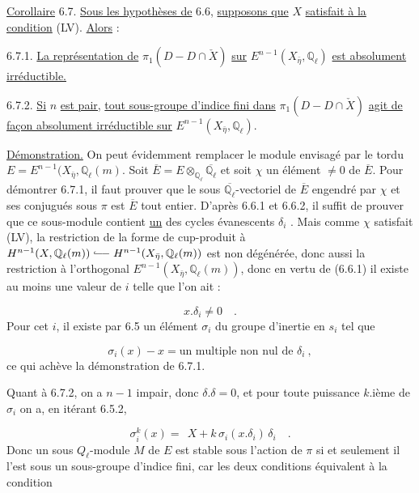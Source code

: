 
\underline{Corollaire} 6.7. \underline{Sous les hypothèses de} 6.6, \underline{supposons que} $X$ \underline{satisfait à la condition} (LV). \underline{Alors} :

6.7.1. \underline{La représentation de} $\pi_1(D - D \cap \check{X})$ \underline{sur} $E^{n-1}(X_{\bar{\eta}},\mathbb{Q}_\ell)$ \underline{est absolument irréductible.}

6.7.2. \underline{Si} $n$ \underline{est pair,} \underline{tout sous-groupe d'indice fini dans} $\pi_1(D - D \cap \check{X})$ \underline{agit de façon absolument irréductible sur} $E^{n-1}(X_{\bar{\eta}},\mathbb{Q}_\ell)$.

\underline{Démonstration.} On peut évidemment remplacer le module envisagé par le tordu $E = E^{n-1}(X_{\bar{\eta}},\mathbb{Q}_\ell(m)$. Soit $\overline{E} = E \otimes_{\mathbb{Q}_\ell} \overline{\mathbb{Q}_\ell}$ et soit $\chi$ un élément $\neq 0$ de $\overline{E}$. Pour démontrer 6.7.1, il faut prouver que le sous $\overline{\mathbb{Q}_\ell}$-vectoriel de $\overline{E}$ engendré par $\chi$ et ses conjugués sous $\pi$ est $\overline{E}$ tout entier. D'après 6.6.1 et 6.6.2, il suffit de prouver que ce sous-module contient \underline{un} des cycles évanescents $\delta_i$ . Mais comme $\chi$ satisfait (LV), la restriction de la forme de cup-produit à $H^{n-1}(X,\mathbb{Q}_\ell(m)) \lhook\joinrel\relbar\joinrel\relbar H^{n-1}(X_{\bar{\eta}},\mathbb{Q}_\ell(m))$ est non dégénérée, donc aussi la restriction à l'orthogonal $E^{n-1}(X_{\bar{\eta}},\mathbb{Q}_\ell(m))$, donc en vertu de (6.6.1) il existe au moins une valeur de $i$ telle que l'on ait :

\begin{equation*}
x.\delta_i \neq 0 \quad .
\end{equation*}
Pour cet $i$, il existe par 6.5 un élément $\sigma_i$ du groupe d'inertie en $s_i$ tel que

\begin{equation}\tag{6.7.3}
\sigma_i(x) - x = \text{un multiple non nul de } \delta_i \ ,
\end{equation}
ce qui achève la démonstration de 6.7.1.



Quant à 6.7.2, on a $n-1$ impair, donc $\delta.\delta = 0$, et pour toute puissance $k$.ième de $\sigma_i$ on a, en itérant 6.5.2,

\begin{equation}\tag{6.7.4}
\sigma_i^k(x) = \ \ X + k\,\sigma_i(x.\delta_i)\,\delta_i \quad .
\end{equation}
Donc un sous $Q_\ell$-module $M$ de $E$ est stable sous l'action de $\pi$ si et seulement il l'est sous un sous-groupe d'indice fini, car les deux conditions équivalent à la condition

